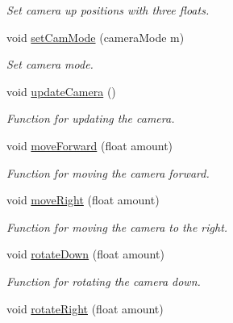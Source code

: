 \begin{DoxyCompactItemize}
\begin{DoxyCompactList}\small\item\em Set camera up positions with three floats. \end{DoxyCompactList}\item 
\hypertarget{class_camera_a290fca3e908e04e51e4a785a14fba8a1}{void \hyperlink{class_camera_a290fca3e908e04e51e4a785a14fba8a1}{set\-Cam\-Mode} (camera\-Mode m)}\label{class_camera_a290fca3e908e04e51e4a785a14fba8a1}

\begin{DoxyCompactList}\small\item\em Set camera mode. \end{DoxyCompactList}\item 
\hypertarget{class_camera_aa67fdde5001bb777ad917c3a1a40fd60}{void \hyperlink{class_camera_aa67fdde5001bb777ad917c3a1a40fd60}{update\-Camera} ()}\label{class_camera_aa67fdde5001bb777ad917c3a1a40fd60}

\begin{DoxyCompactList}\small\item\em Function for updating the camera. \end{DoxyCompactList}\item 
\hypertarget{class_camera_ad47d745253d7c8151ce1d6988e8ccf43}{void \hyperlink{class_camera_ad47d745253d7c8151ce1d6988e8ccf43}{move\-Forward} (float amount)}\label{class_camera_ad47d745253d7c8151ce1d6988e8ccf43}

\begin{DoxyCompactList}\small\item\em Function for moving the camera forward. \end{DoxyCompactList}\item 
\hypertarget{class_camera_ab4f0342b7e3c5b15349a001c9607b6b2}{void \hyperlink{class_camera_ab4f0342b7e3c5b15349a001c9607b6b2}{move\-Right} (float amount)}\label{class_camera_ab4f0342b7e3c5b15349a001c9607b6b2}

\begin{DoxyCompactList}\small\item\em Function for moving the camera to the right. \end{DoxyCompactList}\item 
\hypertarget{class_camera_a0ca570bdc4e7687e3f8cab9eb982d0dc}{void \hyperlink{class_camera_a0ca570bdc4e7687e3f8cab9eb982d0dc}{rotate\-Down} (float amount)}\label{class_camera_a0ca570bdc4e7687e3f8cab9eb982d0dc}

\begin{DoxyCompactList}\small\item\em Function for rotating the camera down. \end{DoxyCompactList}\item 
\hypertarget{class_camera_ae9bfc5f67b5e5eb9bb47159db07365ea}{void \hyperlink{class_camera_ae9bfc5f67b5e5eb9bb47159db07365ea}{rotate\-Right} (float amount)}\label{class_camera_ae9bfc5f67b5e5eb9bb47159db07365ea}


\end{DoxyCompactItemize}
